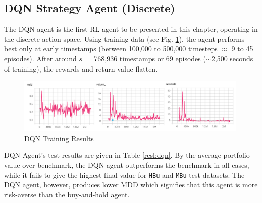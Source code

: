 \subsection{DQN Strategy Agent (Discrete)}
The DQN agent is the first RL agent to be presented in this chapter, operating in the discrete action space. Using training data (see Fig. \ref{gr:dqn:train}), the agent performs best only at early timestamps (between 100,000 to 500,000 timesteps $\approx$ 9 to 45 episodes). After around $s=$ 768,936 timestamps or 69 episodes ($\sim$2,500 seconds of training), the rewards and return value flatten.

\begin{figure}[H]
    \centering
    \includegraphics[width=0.99\textwidth]{graphics/trainphoto/dqntrain.png}
    \caption{DQN Training Results}
    \label{gr:dqn:train}
\end{figure}

DQN Agent's test results are given in Table \ref{resl:dqn}. By the average portfolio value over benchmark, the DQN agent outperforms the benchmark in all cases, while it fails to give the highest final value for \texttt{HBu} and \texttt{MBu} test datasets. The DQN agent, however, produces lower MDD which signifies that this agent is more risk-averse than the buy-and-hold agent.

